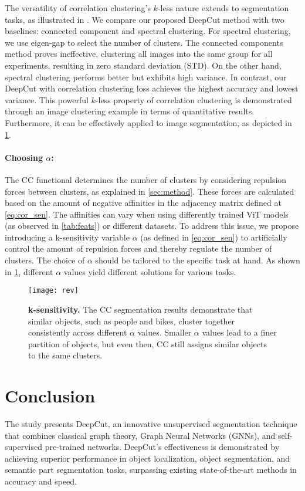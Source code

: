 \documentclass[10pt,twocolumn,letterpaper]{article}
\begin{document}
The versatility of correlation clustering's $k$-less nature extends to segmentation tasks, as illustrated in . We compare our proposed DeepCut method with two baselines: connected component and spectral clustering. For spectral clustering, we use eigen-gap\cite{von2007tutorial} to select the number of clusters. The connected components method proves ineffective, clustering all images into the same group for all experiments, resulting in zero standard deviation (STD). On the other hand, spectral clustering performs better but exhibits high variance. In contrast, our DeepCut with correlation clustering loss achieves the highest accuracy and lowest variance. This powerful $k$-less property of correlation clustering is demonstrated through an image clustering example in terms of quantitative results. Furthermore, it can be effectively applied to image segmentation, as depicted in \cref{fig:rev}.

\paragraph{Choosing $\alpha$:}
The CC functional determines the number of clusters by considering repulsion forces between clusters, as explained in \cref{sec:method}. These forces are calculated based on the amount of negative affinities in the adjacency matrix defined at \cref{eq:cor_sen}. The affinities can vary when using differently trained ViT models (as observed in \cref{tab:feats}) or different datasets. To address this issue, we propose introducing a k-sensitivity variable $\alpha$ (as defined in \cref{eq:cor_sen}) to artificially control the amount of repulsion forces and thereby regulate the number of clusters. The choice of $\alpha$ should be tailored to the specific task at hand. As shown in \cref{fig:rev}, different $\alpha$ values yield different solutions for various tasks.




 \begin{figure}[t]
\texttt{[image: rev]}
\caption{
\textbf{k-sensitivity.} The CC segmentation results demonstrate that similar objects, such as people and bikes, cluster together consistently across different $\alpha$ values. Smaller $\alpha$ values lead to a finer partition of objects, but even then, CC still assigns similar objects to the same clusters.
}
\label{fig:rev}
 \end{figure}



\section{Conclusion}
The study presents DeepCut, an innovative unsupervised segmentation technique that combines classical graph theory, Graph Neural Networks (GNNs), and self-supervised pre-trained networks. DeepCut's effectiveness is demonstrated by achieving superior performance in object localization, object segmentation, and semantic part segmentation tasks, surpassing existing state-of-the-art methods in accuracy and speed.
\end{document}

